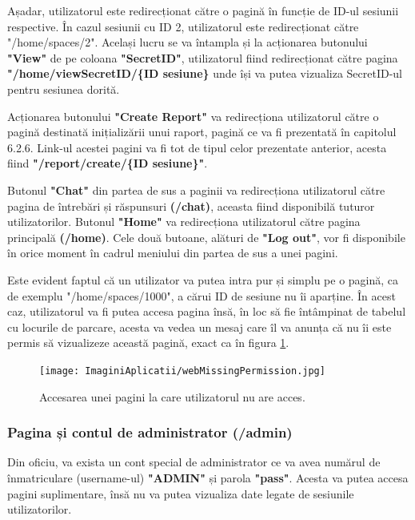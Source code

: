\documentclass[12pt]{article}
\begin{document}
Așadar, utilizatorul este redirecționat c\u{a}tre o pagin\u{a} \^{i}n funcție de ID-ul sesiunii respective. \^{I}n cazul sesiunii cu ID 2, utilizatorul este redirecționat c\u{a}tre "/home/spaces/2". Același lucru se va \^{i}ntampla și la acționarea butonului \textbf{"View"} de pe coloana \textbf{"SecretID"}, utilizatorul fiind redirecționat c\u{a}tre pagina \textbf{"/home/viewSecretID/\{ID sesiune\}} unde \^{i}și va putea vizualiza SecretID-ul pentru sesiunea dorit\u{a}.

Acționarea butonului \textbf{"Create Report"} va redirecționa utilizatorul c\u{a}tre o pagin\u{a} destinat\u{a} inițializ\u{a}rii unui raport, pagin\u{a} ce va fi prezentat\u{a} \^{i}n capitolul 6.2.6. Link-ul acestei pagini va fi tot de tipul celor prezentate anterior, acesta fiind \textbf{"/report/create/\{ID sesiune\}"}.

Butonul \textbf{"Chat"} din partea de sus a paginii va redirecționa utilizatorul c\u{a}tre pagina de \^{i}ntreb\u{a}ri și r\u{a}spunsuri \textbf{(/chat)}, aceasta fiind disponibil\u{a} tuturor utilizatorilor. Butonul \textbf{"Home"} va redirecționa utilizatorul c\u{a}tre pagina principal\u{a} \textbf{(/home)}. Cele dou\u{a} butoane, al\u{a}turi de \textbf{"Log out"}, vor fi disponibile \^{i}n orice moment \^{i}n cadrul meniului din partea de sus a unei pagini.

Este evident faptul c\u{a} un utilizator va putea intra pur și simplu pe o pagin\u{a}, ca de exemplu "/home/spaces/1000", a c\u{a}rui ID de sesiune nu \^{i}i aparține. \^{I}n acest caz, utilizatorul va fi putea accesa pagina \^{i}ns\u{a}, \^{i}n loc s\u{a} fie \^{i}nt\^{a}mpinat de tabelul cu locurile de parcare, acesta va vedea un mesaj care \^{i}l va anunța c\u{a} nu \^{i}i este permis s\u{a} vizualizeze aceast\u{a} pagin\u{a}, exact ca \^{i}n figura \ref{fig:aplicatie_missing_permission}.

\begin{figure}[H]
  \centering
  \texttt{[image: ImaginiAplicatii/webMissingPermission.jpg]}
  \caption{Accesarea unei pagini la care utilizatorul nu are acces.}
  \label{fig:aplicatie_missing_permission}
\end{figure}

\subsubsection{Pagina și contul de administrator (/admin)}

Din oficiu, va exista un cont special de administrator ce va avea num\u{a}rul de \^{i}nmatriculare (username-ul) \textbf{"ADMIN"} și parola \textbf{"pass"}. Acesta va putea accesa pagini suplimentare, \^{i}ns\u{a} nu va putea vizualiza date legate de sesiunile utilizatorilor.
\end{document}
